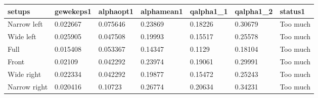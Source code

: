 \begin{tabular}{lllllll}
setups & gewekeps1 & alphaopt1 & alphamean1 & qalpha1_1 & qalpha1_2 & status1 \\ 
\hline 
Narrow left & 0.022667 & 0.075646 & 0.23869 & 0.18226 & 0.30679 & Too much \\ \hline 
Wide left & 0.025905 & 0.047508 & 0.19993 & 0.15517 & 0.25578 & Too much \\ \hline 
Full & 0.015408 & 0.053367 & 0.14347 & 0.1129 & 0.18104 & Too much \\ \hline 
Front & 0.02109 & 0.042292 & 0.23974 & 0.19061 & 0.29991 & Too much \\ \hline 
Wide right & 0.022334 & 0.042292 & 0.19877 & 0.15472 & 0.25243 & Too much \\ \hline 
Narrow right & 0.020416 & 0.10723 & 0.26774 & 0.20634 & 0.34231 & Too much \\ \hline 
\hline 
\end{tabular}